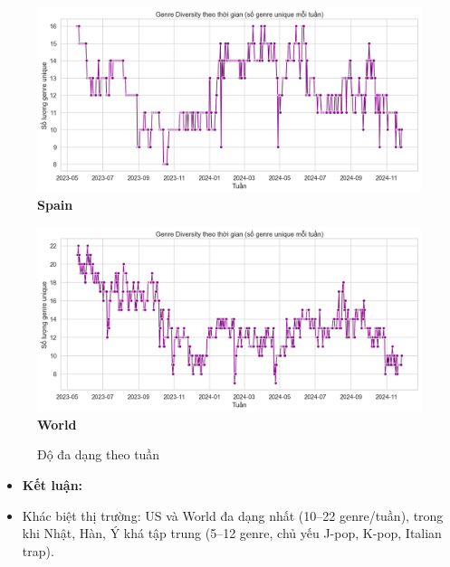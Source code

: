 \begin{itemize}
\begin{figure}[H]
        \vspace{0.4cm}

        \begin{minipage}{0.45\textwidth}
            \centering
            \includegraphics[width=\linewidth]{../graphics/data_top50/figure/24/EDA_spain.png}
            \\[4pt] {\small \textbf{Spain}}
        \end{minipage}
        \hfill
        \begin{minipage}{0.45\textwidth}
            \centering
            \includegraphics[width=\linewidth]{../graphics/data_top50/figure/24/EDA_world.png}
            \\[4pt] {\small \textbf{World}}
        \end{minipage}



        



        
        \caption{Độ đa dạng theo tuần}
    \end{figure}


    \begin{itemize}
        \item \textbf{Kết luận: }
        \item Khác biệt thị trường: US và World đa dạng nhất (10–22 genre/tuần), trong khi Nhật, Hàn, Ý khá tập trung (5–12 genre, chủ yếu J-pop, K-pop, Italian trap).


\end{itemize}
\end{itemize}
